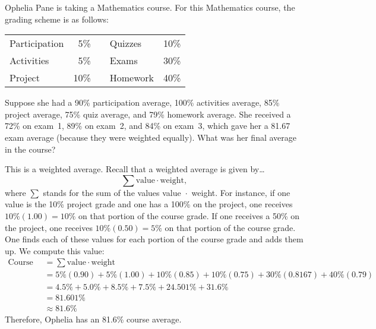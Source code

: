 \documentclass[11pt,letterpaper]{article}
\begin{document}
\newpage



 Ophelia Pane is taking a Mathematics course. For this Mathematics course, the grading scheme is as follows:
	\begin{table}[!ht]
	\centering
	\begin{tabular}{lrclr}
	Participation & 5\% & \hspace{1.5cm} & Quizzes & 10\% \\
	Activities & 5\% & & Exams & 30\% \\
	Project & 10\% & & Homework & 40\%
	\end{tabular}
	\end{table} \par
Suppose she had a 90\% participation average, 100\% activities average, 85\% project average, 75\% quiz average, and 79\% homework average. She received a 72\% on exam~1, 89\% on exam~2, and 84\% on exam~3, which gave her a 81.67 exam average (because they were weighted equally). What was her final average in the course? \pspace

\sol This is a weighted average. Recall that a weighted average is given by\dots \pspace
	\[
	\sum \text{value} \cdot \text{weight},
	\] \pspace
where $\sum$ stands for the sum of the values value~$\cdot$~weight. For instance, if one value is the 10\% project grade and one has a 100\% on the project, one receives $10\%(1.00)= 10\%$ on that portion of the course grade. If one receives a 50\% on the project, one receives $10\%(0.50)= 5\%$ on that portion of the course grade. One finds each of these values for each portion of the course grade and adds them up. We compute this value: \pspace
	\[
	\begin{aligned}
	\text{Course Average}&= \sum \text{value} \cdot \text{weight} \\[0.3cm]
	&= 5\%(0.90) + 5\%(1.00) + 10\%(0.85) + 10\% (0.75) + 30\% (0.8167) + 40\% (0.79) \\[0.3cm]
	&= 4.5\% + 5.0\% + 8.5\% + 7.5\% + 24.501\% + 31.6\% \\[0.3cm]
	&= 81.601\% \\[0.3cm]
	&\approx 81.6\%
	\end{aligned}
	\] \pspace
Therefore, Ophelia has an 81.6\% course average. 



\newpage
\end{document}
